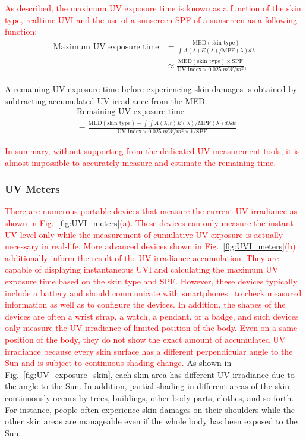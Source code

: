 \documentclass[journal]{IEEEtran}
\begin{document}
\textcolor{red}{As described, the maximum UV exposure time is known as a function of the skin type, realtime UVI and the use of a sunscreen SPF of a sunscreen as a following function:}
%
\begin{equation} \label{eq: max_exp_time}
\begin{split}
\text{Maximum~UV~exposure~time}
&= \frac{\text{MED}(\text{skin~type})}{\int A(\lambda)E(\lambda)  / \text{MPF}(\lambda) d \lambda} \\
&\approx \frac{\text{MED}(\text{skin~type})\times \text{SPF}}{\text{UV~index} \times 0.025~mW/m^2},
\end{split}
\end{equation}

A remaining UV exposure time before experiencing skin damages is obtained by subtracting accumulated UV irradiance from the MED:
%
\begin{equation}
\begin{split}
&\text{Remaining~UV~exposure~time} \\
&= \frac{\text{MED}(\text{skin~type}) - \int \int A(\lambda, t)E(\lambda) / \text{MPF}(\lambda) d \lambda dt}{\text{UV~index} \times 0.025~mW/m^2 \times 1/\text{SPF}}.
\end{split}
\end{equation}

\textcolor{red}{In summary, without supporting from the dedicated UV measurement tools, it is almost impossible to accurately measure and estimate the remaining time.}

\subsubsection{UV Meters}
\textcolor{red}{There are numerous portable devices that measure the current UV irradiance as shown in Fig.~\ref{fig:UVI_meters}(a).
These devices can only measure the instant UV level only while the measurement of cumulative UV exposure is actually necessary in real-life. More advanced devices shown in Fig.~\ref{fig:UVI_meters}(b) additionally inform the result of the UV irradiance accumulation. They are capable of displaying instantaneous UVI and calculating the maximum UV exposure time based on the skin type and SPF.
However, these devices typically include a battery and should communicate with smartphones~\cite{Netatmo, Ultra} to check measured information as well as to configure the devices. In addition, the shapes of the devices are often a wrist strap, a watch, a pendant, or a badge, and such devices only measure the UV irradiance of limited position of the body. Even on a same position of the body, they do not show the exact amount of accumulated UV irradiance because every skin surface has a different perpendicular angle to the Sun and is subject to continuous shading change.}
%
As shown in Fig.~\ref{fig:UV_exposure_skin}, each skin area has different UV irradiance due to the angle to the Sun.
In addition, partial shading in different areas of the skin continuously occurs by trees, buildings, other body parts, clothes, and so forth. For instance, people often experience skin damages on their shoulders while the other skin areas are manageable even if the whole body has been exposed to the Sun.
\end{document}
